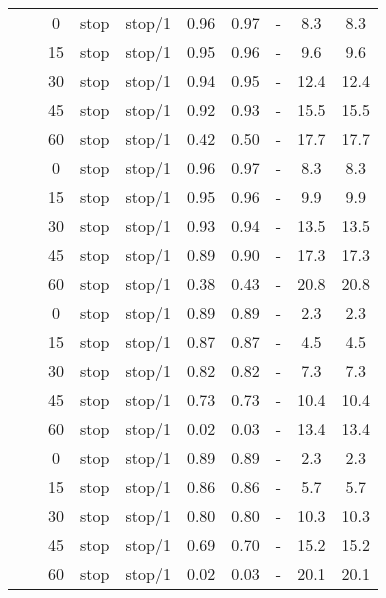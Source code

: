 \begin{longtable}[h!]{cccccccccc}
\cmidrule{1-10}\pagebreak[0]
&  & 0 & stop & stop/1 & 0.96 & 0.97 & - & 8.3 & 8.3\\
\nopagebreak
&  & 15 & stop & stop/1 & 0.95 & 0.96 & - & 9.6 & 9.6\\
\nopagebreak
&  & 30 & stop & stop/1 & 0.94 & 0.95 & - & 12.4 & 12.4\\
\nopagebreak
&  & 45 & stop & stop/1 & 0.92 & 0.93 & - & 15.5 & 15.5\\
\nopagebreak
& \multirow{-5}{*}{\centering\arraybackslash 0.2} & 60 & stop & stop/1 & 0.42 & 0.50 & - & 17.7 & 17.7\\
\nopagebreak
&  & 0 & stop & stop/1 & 0.96 & 0.97 & - & 8.3 & 8.3\\
\nopagebreak
&  & 15 & stop & stop/1 & 0.95 & 0.96 & - & 9.9 & 9.9\\
\nopagebreak
&  & 30 & stop & stop/1 & 0.93 & 0.94 & - & 13.5 & 13.5\\
\nopagebreak
&  & 45 & stop & stop/1 & 0.89 & 0.90 & - & 17.3 & 17.3\\
\nopagebreak
\multirow{-10}{*}{\centering\arraybackslash 14} & \multirow{-5}{*}{\centering\arraybackslash 0.33} & 60 & stop & stop/1 & 0.38 & 0.43 & - & 20.8 & 20.8\\
\cmidrule{1-10}\pagebreak[0]
&  & 0 & stop & stop/1 & 0.89 & 0.89 & - & 2.3 & 2.3\\
\nopagebreak
&  & 15 & stop & stop/1 & 0.87 & 0.87 & - & 4.5 & 4.5\\
\nopagebreak
&  & 30 & stop & stop/1 & 0.82 & 0.82 & - & 7.3 & 7.3\\
\nopagebreak
&  & 45 & stop & stop/1 & 0.73 & 0.73 & - & 10.4 & 10.4\\
\nopagebreak
& \multirow{-5}{*}{\centering\arraybackslash 0.2} & 60 & stop & stop/1 & 0.02 & 0.03 & - & 13.4 & 13.4\\
\nopagebreak
&  & 0 & stop & stop/1 & 0.89 & 0.89 & - & 2.3 & 2.3\\
\nopagebreak
&  & 15 & stop & stop/1 & 0.86 & 0.86 & - & 5.7 & 5.7\\
\nopagebreak
&  & 30 & stop & stop/1 & 0.80 & 0.80 & - & 10.3 & 10.3\\
\nopagebreak
&  & 45 & stop & stop/1 & 0.69 & 0.70 & - & 15.2 & 15.2\\
\nopagebreak
\multirow{-10}{*}{\centering\arraybackslash 15} & \multirow{-5}{*}{\centering\arraybackslash 0.33} & 60 & stop & stop/1 & 0.02 & 0.03 & - & 20.1 & 20.1\\*
\end{longtable}
\endgroup{}


